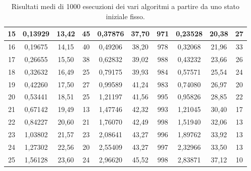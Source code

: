 \begin{table}[]
{\begin{tabular}{|c|c|c|c|c|c|c|c|c|c|}
15                     & 0,13929    & 13,42  & 45           & 0,37876        & 37,70     & 971            & 0,23528        & 20,38      & 27              \\ \hline
16                     & 0,19675    & 14,15  & 40           & 0,49206        & 38,20     & 978            & 0,32068        & 21,96      & 33              \\ \hline
17                     & 0,26655    & 15,50  & 38           & 0,62832        & 39,02     & 988            & 0,43232        & 23,66      & 26              \\ \hline
18                     & 0,32632    & 16,49  & 25           & 0,79175        & 39,93     & 984            & 0,57571        & 25,54      & 24              \\ \hline
19                     & 0,42260    & 17,50  & 27           & 0,99589        & 41,24     & 983            & 0,74080        & 26,97      & 20              \\ \hline
20                     & 0,53441    & 18,51  & 25           & 1,21197        & 41,56     & 995            & 0,95826        & 28,85      & 22              \\ \hline
21                     & 0,67142    & 19,49  & 13           & 1,47746        & 42,32     & 993            & 1,21045        & 30,40      & 17              \\ \hline
22                     & 0,84227    & 20,60  & 21           & 1,76070        & 42,49     & 998            & 1,51940        & 32,06      & 13              \\ \hline
23                     & 1,03802    & 21,57  & 23           & 2,08641        & 43,27     & 996            & 1,89762        & 33,92      & 13              \\ \hline
24                     & 1,27302    & 22,56  & 20           & 2,55409        & 43,27     & 997            & 2,32966        & 33,50      & 13              \\ \hline
25                     & 1,56128    & 23,60  & 24           & 2,96620        & 45,52     & 998            & 2,83871        & 37,12      & 10              \\ \hline
\end{tabular}
}
\caption{Risultati medi di 1000 esecuzioni dei vari algoritmi a partire da uno stato iniziale fisso.}
\label{table:allinitial}
\end{table}
